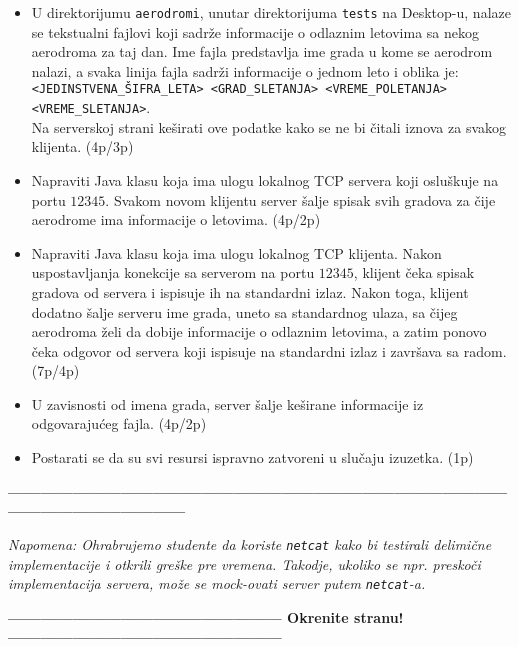 \documentclass[]{article}
\begin{document}
\begin{enumerate}
\begin{itemize}
  \item  U direktorijumu \texttt{aerodromi}, unutar direktorijuma \texttt{tests} na Desktop-u, nalaze se tekstualni fajlovi koji sadrže informacije o odlaznim letovima sa nekog aerodroma za taj dan. Ime fajla predstavlja ime grada u kome se aerodrom nalazi, a svaka linija fajla sadrži informacije o jednom leto i oblika je:\\
  \texttt{<JEDINSTVENA\_ŠIFRA\_LETA> <GRAD\_SLETANJA> <VREME\_POLETANJA> <VREME\_SLETANJA>}.\\
  Na serverskoj strani keširati ove podatke kako se ne bi čitali iznova za svakog klijenta. \hfill (4p/3p)
  \item Napraviti Java klasu koja ima ulogu lokalnog TCP servera koji osluškuje na portu $12345$. Svakom novom klijentu server šalje spisak svih gradova za čije aerodrome ima informacije o letovima.  \hfill (4p/2p)
  \item Napraviti Java klasu koja ima ulogu lokalnog TCP klijenta. Nakon uspostavljanja konekcije sa serverom na portu $12345$, klijent čeka spisak gradova od servera i ispisuje ih na standardni izlaz.  Nakon toga, klijent dodatno šalje serveru ime grada, uneto sa standardnog ulaza, sa čijeg aerodroma želi da dobije informacije o odlaznim letovima, a zatim ponovo čeka odgovor od servera koji ispisuje na standardni izlaz i završava sa radom. \hfill (7p/4p)
  \item U zavisnosti od imena grada, server šalje keširane informacije iz odgovarajućeg fajla. \hfill (4p/2p)
  \item Postarati se da su svi resursi ispravno zatvoreni u slučaju izuzetka. \hfill (1p)
\end{itemize}

\vspace{15pt}

\begin{center}
  \textbf{------------------------------------------------------------------------------------------------------------------------------}
\end{center}
\textit{Napomena: Ohrabrujemo studente da koriste \texttt{netcat} kako bi testirali delimi\v{c}ne implementacije i otkrili gre\v{s}ke pre vremena. Takodje, ukoliko se npr. presko\v{c}i implementacija servera, mo\v{z}e se mock-ovati server putem \texttt{netcat}-a.} 
\begin{center}
  \textbf{--------------------------------------------------- Okrenite stranu! ---------------------------------------------------}
\end{center}


\end{enumerate}
\end{document}
